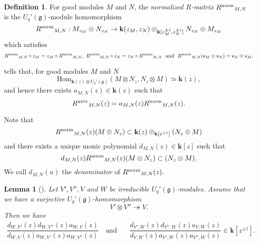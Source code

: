 \documentclass[11pt, leqno]{amsart}
\newtheorem{lemma}[theorem]{Lemma}
\theoremstyle{definition}
\newtheorem{definition}[theorem]{Definition}
\numberwithin{equation}{section}
\begin{document}
\begin{definition}
For good modules $M$ and $N$, the {\it normalized $R$-matrix} ${R^{\rm{norm}}}_{M,N}$ is the ${U_q'({\mathfrak g})}$-module
homomorphism
\begin{equation} \label{Def: R(MN)}
{R^{\rm{norm}}}_{M,N}: M_{z_M} \otimes N_{z_N} \to {\mathbf{k}}(z_M,z_N) \otimes_{{\mathbf{k}}[z_M^{\pm 1},z_N^{\pm 1}]}
 N_{z_N} \otimes M_{z_M}
\end{equation}
which satisfies
$$ {R^{\rm{norm}}}_{M,N} \circ z_M = z_M \circ {R^{\rm{norm}}}_{M,N}, \ {R^{\rm{norm}}}_{M,N} \circ z_N = z_N \circ {R^{\rm{norm}}}_{M,N} \
\text{ and } \ {R^{\rm{norm}}}_{M,N}(\mathsf{v}_{M}\otimes \mathsf{v}_{N})=\mathsf{v}_{N} \otimes \mathsf{v}_{M}.$$
\end{definition}

\cite[Corollary 2.5]{AK} tells that, for good modules $M$ and $N$
$${\mathrm{Hom}}_{{\mathbf{k}}(z)\otimes{U_q'({\mathfrak g})}}( M \otimes N_z, N_z \otimes M) \simeq {\mathbf{k}}(z),$$
and hence there exists $a_{M,N}(z) \in {\mathbf{k}}(z)$ such that
\begin{equation}\label{Def: a(MN)}
{R^{\rm{univ}}}_{M,N}(z)=a_{M,N}(z){R^{\rm{norm}}}_{M,N}(z).
\end{equation}

Note that $${R^{\rm{norm}}}_{M,N}(z)(M \otimes N_z) \subset {\mathbf{k}}(z) \otimes_{{\mathbf{k}}[z^{\pm 1}]}(N_z \otimes M) $$
and there exists a unique monic polynomial $d_{M,N}(z) \in {\mathbf{k}}[z]$ such that
\begin{equation}\label{Def: d(MN)}
d_{M,N}(z){R^{\rm{norm}}}_{M,N}(z)(M \otimes N_z) \subset (N_z \otimes M).
\end{equation}
We call $d_{M,N}(u)$ the {\it denominator} of ${R^{\rm{norm}}}_{M,N}(z)$.

\begin{lemma}[{\cite[Lemma C.15]{AK}}] \label{lem:dvw avw}
Let $V', V'', V$ and $W$ be irreducible $U_q'({\mathfrak g})$-modules. Assume that we have a surjective $U_q'({\mathfrak g})$-homomorphism
$$ V'\otimes V'' \twoheadrightarrow V.$$ Then we have
  \begin{align*}
   \dfrac{ d_{W,V'}(z) d_{W,V''}(z) a_{W,V}(z)}{d_{W,V}(z)a_{W,V'}(z)a_{W,V''}(z)}
   \quad \text{and} &\quad
   \dfrac{ d_{V',W}(z) d_{V'',W}(z) a_{V,W}(z)}{d_{V,W}(z)a_{V',W}(z)a_{V'',W}(z)} \in {\mathbf{k}}[z^{\pm 1}].
  \end{align*}
\end{lemma}
\end{document}
